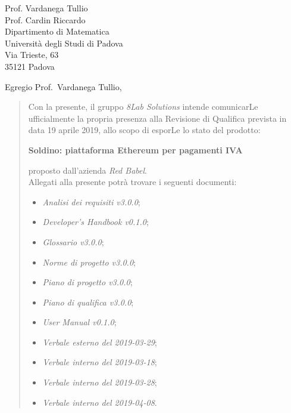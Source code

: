 
\begin{letter}{
		Prof. Vardanega Tullio \\
		Prof. Cardin Riccardo \\
		Dipartimento di Matematica \\
		Università degli Studi di Padova \\
		Via Trieste, 63 \\
		35121 Padova}
		
\opening{Egregio Prof.~Vardanega Tullio,}

\begin{quotation}
Con la presente, il gruppo \textit{8Lab Solutions} intende 
comunicarLe ufficialmente la propria presenza alla Revisione di 
Qualifica prevista in data 19 aprile 2019, allo scopo di 
esporLe lo stato del prodotto:

\begin{center}
	\textbf{Soldino: piattaforma Ethereum per pagamenti IVA}
\end{center}

\noindent proposto dall'azienda \textit{Red Babel}. \\
Allegati alla presente potrà trovare i seguenti documenti:

\begin{itemize}
	\item \textit{Analisi dei requisiti v3.0.0};
	
	\item \textit{Developer's Handbook v0.1.0};
	
	\item \textit{Glossario v3.0.0};
	
	\item \textit{Norme di progetto v3.0.0};

	\item \textit{Piano di progetto v3.0.0};

	\item \textit{Piano di qualifica v3.0.0};
	
	\item \textit{User Manual v0.1.0};
	
	
	\item \textit{Verbale esterno del 2019-03-29};
	\item \textit{Verbale interno del 2019-03-18};
	\item \textit{Verbale interno del 2019-03-28};
	\item \textit{Verbale interno del 2019-04-08}.
\end{itemize}
	



\end{quotation}
\end{letter}

